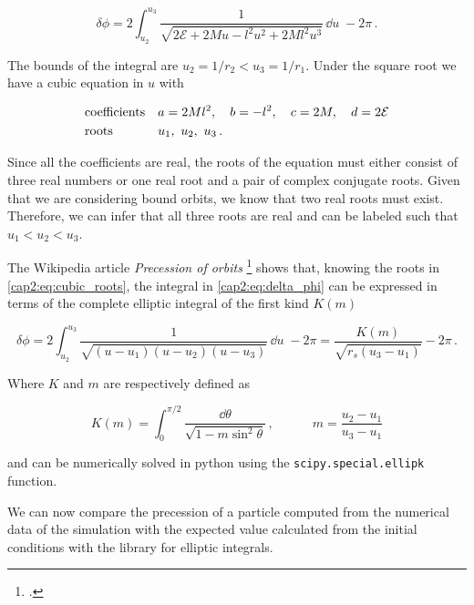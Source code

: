 \begin{equation}
    \delta \phi = 2 \int_{u_2}^{u_3} \frac{1}{\sqrt{2 \mathcal E + 2Mu - l^2 u^2
    + 2Ml^2 u^3}} \, \dd{u}
    \; - 2 \pi \, .
    \label{cap2:eq:delta_phi}
\end{equation}

The bounds of the integral are $u_2 = 1 / r_2 < u_3 = 1 / r_1$.
Under the square root we have a cubic equation in $u$ with

\begin{align}
    &{\rm coefficients} && a = 2Ml^2, \quad b = -l^2, \quad c = 2M, \quad d = 2 \mathcal E \\
    &{\rm roots}        && u_1, ~ u_2, ~ u_3 \, .
    \label{cap2:eq:cubic_roots}
\end{align}

Since all the coefficients are real, the roots of the equation must either
consist of three real numbers or one real root and a pair of complex conjugate
roots.
Given that we are considering bound orbits, we know that two real roots must
exist.
Therefore, we can infer that all three roots are real and can be labeled such
that $u_1 < u_2 < u_3$.

The Wikipedia article \textit{Precession of orbits} \footcite{enwiki:1242536958}
shows that, knowing the roots in \ref{cap2:eq:cubic_roots}, the integral in
\ref{cap2:eq:delta_phi} can be expressed in terms of the complete elliptic
integral of the first kind $K(m)$

\begin{equation}
    \delta \phi = 2 \int_{u_2}^{u_3} \frac{1}{\sqrt{(u - u_1)(u - u_2)(u - u_3)}}
    \, \dd{u} \; - 2 \pi
    = \frac{K(m)}{\sqrt{r_s (u_3 - u_1)}} - 2 \pi \, .
    \label{cap2:eq:delta_phi_elliptic}
\end{equation}

Where $K$ and $m$ are respectively defined as

\begin{equation}
    K(m) = \int_0^{\pi/2} \frac{\dd{\theta}}{\sqrt{1 - m \sin^2 \theta}} \, ,
    \quad \quad \quad
    m = \frac{u_2 - u_1}{u_3 - u_1}
\end{equation}

and can be numerically solved in python using the \texttt{scipy.special.ellipk}
function.

We can now compare the precession of a particle computed from the numerical data
of the simulation with the expected value calculated from the initial conditions
with the library for elliptic integrals.

